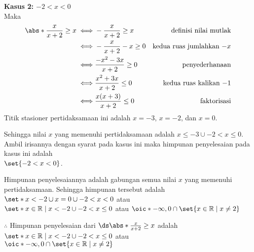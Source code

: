 \begin{enumerate}[leftmargin=*, label={\arabic*}.]
\begin{enumerate}[label={\alph*}.]
\textbf{Kasus 2: $-2 < x < 0$}\\
Maka
\begin{align*}
    \abs*{\frac{x}{x+2}} \geq x
    \iff &-\frac{x}{x+2} \geq x
    &\text{definisi nilai mutlak} \\
    \iff &-\frac{x}{x+2} -x \geq 0
    &\text{kedua ruas jumlahkan $-x$}\\
    \iff &\frac{-x^{2}-3x}{x+2} \geq 0
    &\text{penyederhanaan}\\
    \iff &\frac{x^{2}+3x}{x+2} \leq 0
    &\text{kedua ruas kalikan $-1$}\\
    \iff &\frac{x(x+3)}{x+2} \leq 0
    &\text{faktorisasi}\\
\end{align*}
Titik stasioner pertidaksamaan ini adalah $x=-3$, $x=-2$, dan $x=0$.
\begin{center}
\end{center}
Sehingga nilai $x$ yang memenuhi pertidaksamaan adalah $x \leq -3 \cup -2 < x \leq 0$. Ambil 
irisannya dengan syarat pada kasus ini maka himpunan penyelesaian pada kasus ini adalah 
\\$\set{-2 < x < 0}$. 

Himpunan penyelesaiannya adalah gabungan semua nilai $x$ yang memenuhi pertidaksamaan. 
Sehingga himpunan tersebut adalah 
$\set*{x < -2 \cup x = 0 \cup -2 < x < 0}$ 
atau \\
$\set*{x \in \mathbb{R} \mid x < -2 \cup -2 < x \leq 0}$
atau
$\oic*{-\infty,0} \cap \set{x \in \mathbb{R} \mid x \neq 2}$

$\therefore$ Himpunan penyelesaian dari 
$\ds \abs*{\frac{x}{x+2}} \geq x$ adalah 
$\set*{x \in \mathbb{R} \mid x < -2 \cup -2 < x \leq 0}$
atau \\
$\oic*{-\infty,0} \cap \set{x \in \mathbb{R} \mid x \neq 2}$


\end{enumerate}
\end{enumerate}
